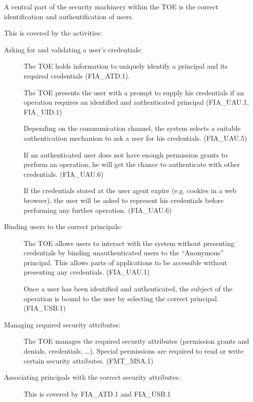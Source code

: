 \documentclass[12pt,english]{scrbook}
\begin{document}
    A central part of the security machinery within the TOE is the correct
    identification and authentification of users.

    This is covered by the activities:

    \begin{description}
        \item[Asking for and validating a user's credentials:]

            The TOE holds information to uniquely identify a principal and its
            required credentials (FIA\_ATD.1).
            
            The TOE presents the user with a prompt to supply his credentials
            if an operation requires an identified and authenticated principal (FIA\_UAU.1, FIA\_UID.1)

            Depending on the communication channel, the system selects a
            suitable authentication mechanism to ask a user for his
            credentials. (FIA\_UAU.5)

            If an authenticated user does not have enough permission grants to
            perform an operation, he will get the chance to authenticate with
            other credentials. (FIA\_UAU.6)

            If the credentials stored at the user agent expire (e.g. cookies in
            a web browser), the user will be asked to represent his credentials
            before performing any further operation. (FIA\_UAU.6)

        \item[Binding users to the correct principals:]

            The TOE allows users to interact with the system without presenting
            credentials by binding unauthenticated users to the ``Anonymous''
            principal. This allows parts of applications to be accessible without
            presenting any credentials. (FIA\_UAU.1)

            Once a user has been identified and authenticated, the subject of
            the operation is bound to the user by selecting the correct
            principal. (FIA\_USB.1)

        \item[Managing required security attributes:]

            The TOE manages the required security attributes (permission grants
            and denials, credentials, \dots). Special permissions are required
            to read or write certain security attributes. (FMT\_MSA.1)

        \item[Associating principals with the correct security attributes:]

            This is covered by FIA\_ATD.1 and FIA\_USB.1

    \end{description}
\end{document}
